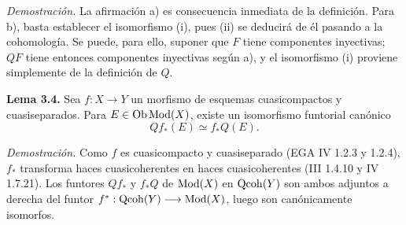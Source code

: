 \emph{Demostración.} La afirmación a) es consecuencia inmediata de la definición. Para b), basta establecer el isomorfismo (i), pues (ii) se deducirá de él pasando a la cohomología. Se puede, para ello, suponer que $F$ tiene componentes inyectivas; $QF$ tiene entonces componentes inyectivas según a), y el isomorfismo (i) proviene simplemente de la definición de $Q$.

\textbf{Lema 3.4.} Sea $f:X\longrightarrow Y$ un morfismo de esquemas cuasicompactos y cuasiseparados. Para $E\in\operatorname{Ob}\operatorname{Mod}(X)$, existe un isomorfismo funtorial canónico
\[
 Qf_*(E)\simeq f_*Q(E).
\]

\emph{Demostración.} Como $f$ es cuasicompacto y cuasiseparado (EGA IV 1.2.3 y 1.2.4), $f_*$ transforma haces cuasicoherentes en haces cuasicoherentes (III 1.4.10 y IV 1.7.21). Los funtores $Qf_*$ y $f_*Q$ de $\operatorname{Mod}(X)$ en $\operatorname{Qcoh}(Y)$ son ambos adjuntos a derecha del funtor $f^*:\operatorname{Qcoh}(Y)\longrightarrow\operatorname{Mod}(X)$, luego son canónicamente isomorfos.

